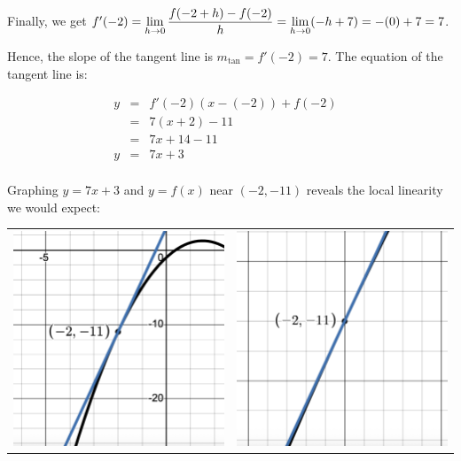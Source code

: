 \documentclass{ximera}
\begin{document}
\begin{ex}
\begin{enumerate}
Finally, we get $ f'(-2) = \ds{\lim_{h \rightarrow 0} \dfrac{f(-2+h) - f(-2)}{h} = \lim_{h \rightarrow 0} (-h+7) = -(0) + 7 = 7}$.

\bigskip

Hence, the slope of the tangent line is $m_{\text{tan}} = f'(-2) = 7$.  The equation of the tangent line is: 

\[ \begin{array}{rclr}  
 y & = & f'(-2)(x - (-2)) + f(-2) & \\ 
  & = & 7(x+2) - 11 & \\
 & = & 7x+14 - 11& \\
  y & = & 7x+3& \\
 \end{array} \]

Graphing $y = 7x+3$ and $y = f(x)$ near $(-2,-11)$ reveals the local linearity we would expect:

\begin{center}

\begin{tabular}{cc}

 \includegraphics[width=2.5in]{./IntroductiontoDerivativesGraphics/TLEx.png} &  \includegraphics[width=2.5in]{./IntroductiontoDerivativesGraphics/TLExZoom.png}  \\
 

\end{tabular}
\end{center}
\end{enumerate}
\end{ex}
\end{document}
